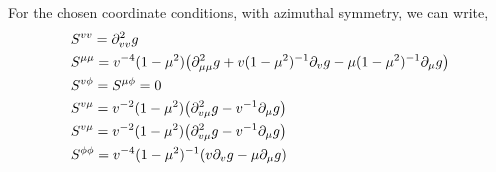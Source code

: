 \documentclass{article}[draft]
\begin{document}
For the chosen coordinate conditions, with azimuthal symmetry, we can write, 
\begin{align*}
	&S^{vv}     = \partial^2_{vv} g \\
	&S^{\mu\mu} = v^{-4}(1-\mu^2)\of{ \partial^2_{\mu\mu} g + v(1-\mu^2)^{-1} \partial_v g -\mu(1-\mu^2)^{-1} \partial_{\mu} g} \\
	&S^{v\phi} = S^{\mu\phi} =0 \\
	&S^{v\mu}  = v^{-2}(1-\mu^2)\of{\partial^2_{v\mu} g - v^{-1} \partial_{\mu} g} \\
	&S^{v\mu}  = v^{-2}(1-\mu^2)\of{\partial^2_{v\mu} g - v^{-1} \partial_{\mu} g} \\
	&S^{\phi\phi} = v^{-4}(1-\mu^2)^{-1} \of{v\partial_v g - \mu \partial_{\mu} g}
\end{align*}


\end{document}
